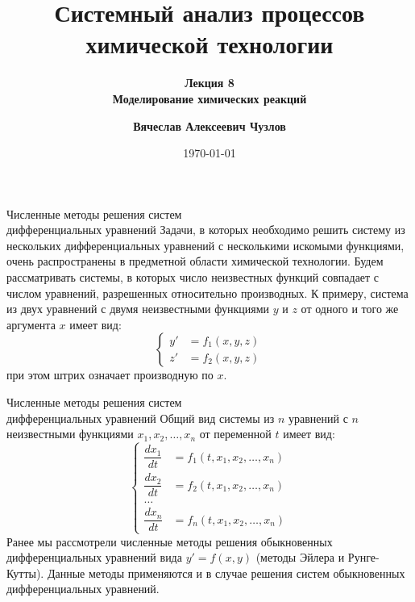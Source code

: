 \documentclass[aspectratio=169, mathserif]{beamer}	%
\title{\LARGE{Системный анализ процессов химической технологии}}
\subtitle{\textcolor{tpugreen}{\textbf{Лекция 8}} \\ \textbf{Моделирование химических реакций}}
\author[]{\textbf{Вячеслав Алексеевич Чузлов}}
\institute{к.т.н., доцент ОХИ ИШПР}
\date{\today}
\begin{document}

\titleframe		%

\tocframe{}		%



\begin{frame}[fragile, ]{Численные методы решения систем \\ дифференциальных уравнений}
\scriptsize
Задачи, в которых необходимо решить систему из нескольких дифференциальных уравнений с несколькими искомыми функциями, очень распространены в предметной области химической технологии.
\vfill
Будем рассматривать системы, в которых число неизвестных функций совпадает с числом уравнений, разрешенных относительно производных.
\vfill
К примеру, система из двух уравнений с двумя неизвестными функциями $y$ и $z$ от одного и того же аргумента $x$ имеет вид:
\vfill
\begin{equation}\label{system-ODE}
	\left\{
	\begin{aligned}
		y' &= f_1\left(x, y, z\right)\\
		z' &= f_2\left(x, y, z\right)
	\end{aligned}
	\right.
\end{equation}
\vfill
\noindent при этом штрих означает производную по $x$.
\vfill
\end{frame}


\begin{frame}[fragile, ]{Численные методы решения систем \\ дифференциальных уравнений}
\scriptsize
Общий вид системы из $n$ уравнений с $n$ неизвестными функциями $x_1, x_2, \ldots, x_n$ от переменной $t$ имеет вид:
\vfill
\begin{equation}\label{system-ODE2}
	\left\{
	\begin{aligned}
		\dfrac{dx_1}{dt} &= f_1\left(t, x_1, x_2, \ldots, x_n\right) \\
		\dfrac{dx_2}{dt} &= f_2\left(t, x_1, x_2, \ldots, x_n\right) \\
		\ldots & \\
		\dfrac{dx_n}{dt} &= f_n\left(t, x_1, x_2, \ldots, x_n\right)
	\end{aligned}
	\right.
\end{equation}
\vfill
Ранее мы рассмотрели численные методы решения обыкновенных дифференциальных уравнений вида $y'=f(x,y)$ (методы Эйлера и Рунге-Кутты). Данные методы применяются и в случае решения систем обыкновенных дифференциальных уравнений.
\vfill
\end{frame}
\end{document}
